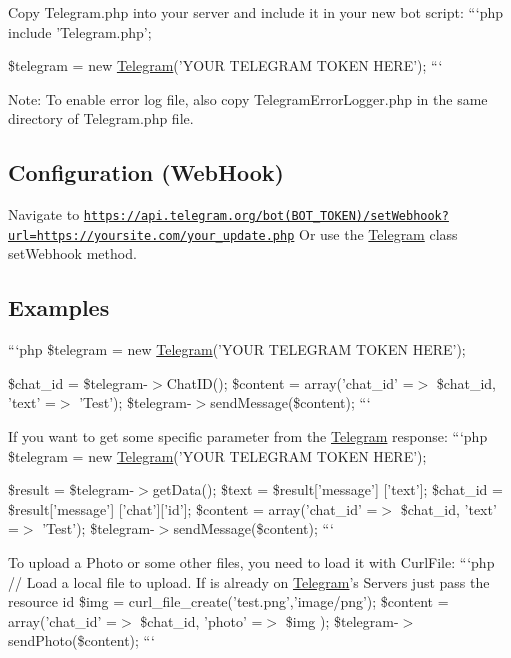 Copy Telegram.\-php into your server and include it in your new bot script\-: ```php include 'Telegram.\-php';

\$telegram = new \hyperlink{class_telegram}{Telegram}('Y\-O\-U\-R T\-E\-L\-E\-G\-R\-A\-M T\-O\-K\-E\-N H\-E\-R\-E'); ```

Note\-: To enable error log file, also copy Telegram\-Error\-Logger.\-php in the same directory of Telegram.\-php file.

\subsection*{Configuration (Web\-Hook) }

Navigate to \href{https://api.telegram.org/bot(BOT_TOKEN)/setWebhook?url=https://yoursite.com/your_update.php}{\tt https\-://api.\-telegram.\-org/bot(\-B\-O\-T\-\_\-\-T\-O\-K\-E\-N)/set\-Webhook?url=https\-://yoursite.\-com/your\-\_\-update.\-php} Or use the \hyperlink{class_telegram}{Telegram} class set\-Webhook method.

\subsection*{Examples }

```php \$telegram = new \hyperlink{class_telegram}{Telegram}('Y\-O\-U\-R T\-E\-L\-E\-G\-R\-A\-M T\-O\-K\-E\-N H\-E\-R\-E');

\$chat\-\_\-id = \$telegram-\/$>$Chat\-I\-D(); \$content = array('chat\-\_\-id' =$>$ \$chat\-\_\-id, 'text' =$>$ 'Test'); \$telegram-\/$>$send\-Message(\$content); ```

If you want to get some specific parameter from the \hyperlink{class_telegram}{Telegram} response\-: ```php \$telegram = new \hyperlink{class_telegram}{Telegram}('Y\-O\-U\-R T\-E\-L\-E\-G\-R\-A\-M T\-O\-K\-E\-N H\-E\-R\-E');

\$result = \$telegram-\/$>$get\-Data(); \$text = \$result\mbox{[}'message'\mbox{]} \mbox{[}'text'\mbox{]}; \$chat\-\_\-id = \$result\mbox{[}'message'\mbox{]} \mbox{[}'chat'\mbox{]}\mbox{[}'id'\mbox{]}; \$content = array('chat\-\_\-id' =$>$ \$chat\-\_\-id, 'text' =$>$ 'Test'); \$telegram-\/$>$send\-Message(\$content); ```

To upload a Photo or some other files, you need to load it with Curl\-File\-: ```php // Load a local file to upload. If is already on \hyperlink{class_telegram}{Telegram}'s Servers just pass the resource id \$img = curl\-\_\-file\-\_\-create('test.\-png','image/png'); \$content = array('chat\-\_\-id' =$>$ \$chat\-\_\-id, 'photo' =$>$ \$img ); \$telegram-\/$>$send\-Photo(\$content); ```

